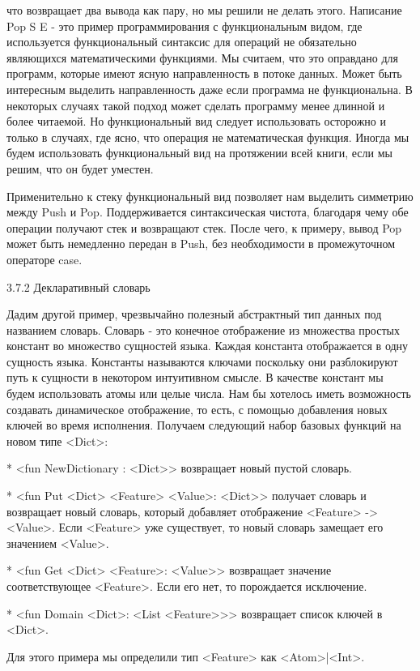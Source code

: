 что возвращает два вывода как пару, но мы решили не делать этого. Написание {Pop S E} - это пример программирования с функциональным видом, где используется функциональный синтаксис для операций не обязательно являющихся математическими функциями. Мы считаем, что это оправдано для программ, которые имеют ясную направленность в потоке данных. Может быть интересным выделить направленность даже если программа не функциональна. В некоторых случаях такой подход может сделать программу менее длинной и более читаемой. Но функциональный вид следует использовать осторожно и только в случаях, где ясно, что операция не математическая функция. Иногда мы будем использовать функциональный вид на протяжении всей книги, если мы решим, что он будет уместен.

Применительно к стеку функциональный вид позволяет нам выделить симметрию между Push и Pop. Поддерживается синтаксическая чистота, благодаря чему обе операции получают стек и возвращают стек. После чего, к примеру, вывод Pop может быть немедленно передан в Push, без необходимости в промежуточном операторе case.

3.7.2 Декларативный словарь

Дадим другой пример, чрезвычайно полезный абстрактный тип данных под названием словарь. Словарь - это конечное отображение из множества простых констант во множество сущностей языка. Каждая константа отображается в одну сущность языка. Константы называются ключами поскольку они разблокируют путь к сущности в некотором интуитивном смысле. В качестве констант мы будем использовать атомы или целые числа. Нам бы хотелось иметь возможность создавать динамическое отображение, то есть, с помощью добавления новых ключей во время исполнения. Получаем следующий набор базовых функций на новом типе <Dict>:

* <fun {NewDictionary} : <Dict>> возвращает новый пустой словарь.

* <fun {Put <Dict> <Feature> <Value>}: <Dict>> получает словарь и возвращает новый словарь, который добавляет отображение <Feature> -> <Value>. Если <Feature> уже существует, то новый словарь замещает его значением <Value>.

* <fun {Get <Dict> <Feature>}: <Value>> возвращает значение соответствующее <Feature>. Если его нет, то порождается исключение.

* <fun {Domain <Dict>}: <List <Feature>>> возвращает список ключей в <Dict>.

Для этого примера мы определили тип <Feature> как <Atom>|<Int>.

